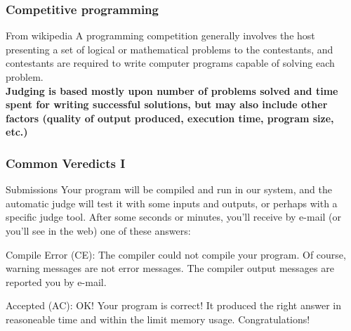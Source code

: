 \documentclass{beamer}
\begin{document}
\begin{frame}
	\frametitle{Competitive programming}
		\begin{block}{From wikipedia}
		A programming competition generally involves the host presenting a set of logical or 		mathematical problems to the contestants, and contestants are required to write computer programs capable of solving each problem. \newline \\
		\textbf{Judging is based mostly upon number of problems solved and time spent for 			writing successful solutions, but may also include other factors (quality of output 			produced, execution time, program size, etc.)}
		\end{block}
\end{frame}

\begin{frame}
	\frametitle {Common Veredicts I}
	\begin{block}{Submissions}
	Your program will be compiled and run in our system, and the automatic judge will test 		it with some inputs and outputs, or perhaps with a specific judge tool. After some 			seconds	or minutes, you'll receive by e-mail (or you'll see in the web) one of these 			answers:
	\end{block}
	
	\begin{block}{Compile Error (CE):}
	The compiler could not compile your program. Of course, warning messages are not error messages. The compiler output messages are reported you by e-mail.
	\end{block}
	
	\begin{block}{Accepted (AC):}
	OK! Your program is correct! It produced the right answer in reasoneable time and within the limit memory usage. Congratulations!
	\end{block}
	
	

\end{frame}
\end{document}
